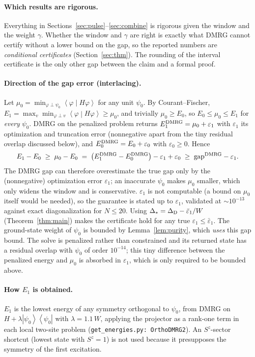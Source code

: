 \documentclass[11pt]{article}
\theoremstyle{definition}
\newcommand{\ket}[1]{\left\lvert #1\right\rangle}
\newcommand{\bra}[1]{\left\langle #1\right\rvert}
\newcommand{\braket}[2]{\left\langle #1 \middle| #2\right\rangle}
\newcommand{\code}[1]{\texttt{#1}}
\begin{document}
\paragraph{Which results are rigorous.} Everything in Sections~\ref{sec:pulse}--\ref{sec:combine} is rigorous given the window and the weight
$\gamma$. Whether the window and $\gamma$ are right is exactly what DMRG cannot certify without a lower bound on the gap, so the reported
numbers are \emph{conditional certificates} (Section~\ref{sec:thm}). The rounding of the interval certificate is the only other gap between
the claim and a formal proof.

\paragraph{Direction of the gap error (interlacing).} Let $\mu_0=\min_{\varphi\perp\psi_0}\braket{\varphi}{H\varphi}$ for any unit $\psi_0$.
By Courant--Fischer, $E_1=\max_v\min_{\varphi\perp v}\braket{\varphi}{H\varphi}\ge\mu_0$, and trivially $\mu_0\ge E_0$, so
$E_0\le\mu_0\le E_1$ for \emph{every} $\psi_0$. DMRG on the penalized problem returns $E_1^{\rm DMRG}=\mu_0+\varepsilon_1$ with
$\varepsilon_1$ its optimization and truncation error (nonnegative apart from the tiny residual overlap discussed below), and $E_0^{\rm DMRG}=E_0+\varepsilon_0$ with $\varepsilon_0\ge0$. Hence
\[
  E_1-E_0\;\ge\;\mu_0-E_0\;=\;\bigl(E_1^{\rm DMRG}-E_0^{\rm DMRG}\bigr)-\varepsilon_1+\varepsilon_0\;\ge\;\mathrm{gap}^{\rm DMRG}-\varepsilon_1 .
\]
The DMRG gap can therefore overestimate the true gap only by the (nonnegative) optimization error $\varepsilon_1$; an inaccurate
$\psi_0$ makes $\mu_0$ smaller, which only widens the window and is conservative. $\varepsilon_1$ is not computable (a bound on
$\mu_0$ itself would be needed), so the guarantee is stated up to $\varepsilon_1$, validated at $\sim10^{-13}$ against exact
diagonalization for $N\le20$. Using $\Delta_*=\Delta_{\rm D}-\bar\varepsilon_1/W$ (Theorem~\ref{thm:main}) makes the certificate hold for any
true $\varepsilon_1\le\bar\varepsilon_1$. The ground-state weight of $\psi_0$ is bounded by Lemma~\ref{lem:purity}, which \emph{uses} this gap bound.
The solve is penalized rather than constrained and its returned state has a residual overlap with $\psi_0$ of order $10^{-14}$; this tiny
difference between the penalized energy and $\mu_0$ is absorbed in $\varepsilon_1$, which is only required to be bounded above.

\paragraph{How $E_1$ is obtained.} $E_1$ is the lowest energy of any symmetry orthogonal to $\psi_0$, from DMRG on
$H+\lambda\ket{\psi_0}\!\bra{\psi_0}$ with $\lambda=1.1\,W$, applying the projector as a rank-one term in each local two-site
problem (\code{get\_energies.py: OrthoDMRG2}). An $S^z$-sector shortcut (lowest state with $S^z=1$) is not used because it presupposes the symmetry of the first excitation.
\end{document}
